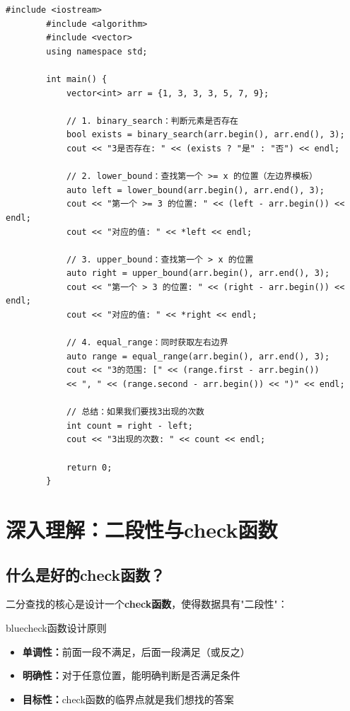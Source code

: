 \documentclass[12pt,a4paper]{article}
\begin{document}
	\begin{lstlisting}[caption={STL二分查找函数使用示例}]
		#include <iostream>
		#include <algorithm>
		#include <vector>
		using namespace std;
		
		int main() {
			vector<int> arr = {1, 3, 3, 3, 5, 7, 9};
			
			// 1. binary_search：判断元素是否存在
			bool exists = binary_search(arr.begin(), arr.end(), 3);
			cout << "3是否存在: " << (exists ? "是" : "否") << endl;
			
			// 2. lower_bound：查找第一个 >= x 的位置（左边界模板）
			auto left = lower_bound(arr.begin(), arr.end(), 3);
			cout << "第一个 >= 3 的位置: " << (left - arr.begin()) << endl;
			cout << "对应的值: " << *left << endl;
			
			// 3. upper_bound：查找第一个 > x 的位置
			auto right = upper_bound(arr.begin(), arr.end(), 3);
			cout << "第一个 > 3 的位置: " << (right - arr.begin()) << endl;
			cout << "对应的值: " << *right << endl;
			
			// 4. equal_range：同时获取左右边界
			auto range = equal_range(arr.begin(), arr.end(), 3);
			cout << "3的范围: [" << (range.first - arr.begin()) 
			<< ", " << (range.second - arr.begin()) << ")" << endl;
			
			// 总结：如果我们要找3出现的次数
			int count = right - left;
			cout << "3出现的次数: " << count << endl;
			
			return 0;
		}
	\end{lstlisting}
	
	\section{深入理解：二段性与check函数}
	
	\subsection{什么是好的check函数？}
	
	二分查找的核心是设计一个\textbf{check函数}，使得数据具有"二段性"：
	
	\begin{mybox}{blue}{check函数设计原则}
		\begin{itemize}
			\item \textbf{单调性：}前面一段不满足，后面一段满足（或反之）
			\item \textbf{明确性：}对于任意位置，能明确判断是否满足条件
			\item \textbf{目标性：}check函数的临界点就是我们想找的答案
		\end{itemize}
	\end{mybox}
	
\end{document}
